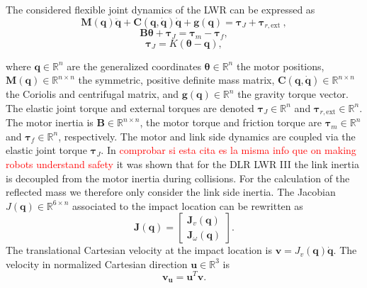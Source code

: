The considered flexible joint dynamics of the LWR can be expressed as
\begin{equation}
\mathbf{M} (\mathbf{q}) \ddot{\mathbf{q}} + \mathbf{C}(\mathbf{q}, \dot{\mathbf{q}}) \dot{\mathbf{q}} + \mathbf{g}(\mathbf{q})  = \mathbf{\tau}_J + \mathbf{\tau}_{r,\mathrm{ext}} \label{eq:flex_dyn_1}  \ ,
\end{equation}
\begin{equation}
\mathbf{B} \mathbf{\theta} + \mathbf{\tau}_J  = \mathbf{\tau}_m - \mathbf{\tau}_f   ,
\end{equation}
\begin{equation}
\mathbf{\tau}_J  = K(\mathbf{\theta} - \mathbf{q})  , 
\end{equation}

where $\mathbf{q} \in \mathbb{R}^n$ are the generalized coordinates $\mathbf{\theta} \in \mathbb{R}^n$ the motor positions, $\mathbf{M}(\mathbf{q})  \in \mathbb{R}^{n \times n}$ the symmetric, positive definite mass matrix, $\mathbf{C}(\mathbf{q}, \dot{\mathbf{q}})  \in \mathbb{R}^{n \times n}$ the Coriolis and centrifugal matrix, and $\mathbf{g}(\mathbf{q}) \in \mathbb{R}^n$ the gravity torque vector. The elastic joint torque and external torques are denoted $\mathbf{\tau}_J  \in \mathbb{R}^n$ and $\mathbf{\tau}_{r,\mathrm{ext}} \in \mathbb{R}^n$. The motor inertia is $\mathbf{B} \in \mathbb{R}^{n \times n}$, the motor torque and friction torque are $\mathbf{\tau}_m \in \mathbb{R}^n$ and $\mathbf{\tau}_f \in \mathbb{R}^n$, respectively. The motor and link side dynamics are coupled via the elastic joint torque $\mathbf{\tau}_J$.
In \cite{haddadin_et_al_ijrr2009} \textcolor{red}{comprobar si esta cita es la misma info que on making robots understand safety} it was shown that for the DLR LWR III the link inertia is decoupled from the motor inertia during collisions. For the calculation of the reflected mass we therefore only consider the link side inertia. The Jacobian $J(\mathbf{q}) \in \mathbb{R}^{6 \times n}$ associated to the impact location can be rewritten as
\begin{equation}
\mathbf{J}(\mathbf{q}) = 
\begin{bmatrix}
\mathbf{J}_{v}(\mathbf{q}) \\
\mathbf{J}_{\omega}(\mathbf{q})
\end{bmatrix}.
\label{eq:jacobian_expanded}
\end{equation}
The translational Cartesian velocity at the impact location is 
$\mathbf{v} = J_{v}({\mathbf{q}}) \dot{\mathbf{q}}$. The velocity in normalized Cartesian direction $\mathbf{u} \in \mathbb{R}^3$ is 
\begin{equation}
\mathbf{v_u} = \mathbf{u}^T \mathbf{v} .
\end{equation}

